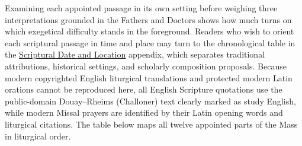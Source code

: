 Examining each appointed passage in its own setting before weighing three interpretations grounded in the Fathers and Doctors shows how much turns on which exegetical difficulty stands in the foreground. Readers who wish to orient each scriptural passage in time and place may turn to the chronological table in the \hyperref[sec:date-location]{Scriptural Date and Location} appendix, which separates traditional attributions, historical settings, and scholarly composition proposals. Because modern copyrighted English liturgical translations and protected modern Latin orations cannot be reproduced here, all English Scripture quotations use the public-domain Douay--Rheims (Challoner) text clearly marked as study English, while modern Missal prayers are identified by their Latin opening words and liturgical citations. The table below maps all twelve appointed parts of the Mass in liturgical order.

